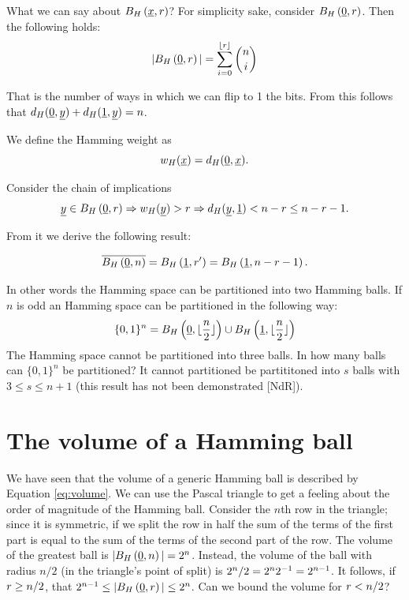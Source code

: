 What we can say about $B_H\left(\underline{x}, r\right)$? For simplicity sake, consider $B_H\left(\underline{0}, r\right)$. Then the following holds:
\begin{equation}\label{eq:volume}
	|B_H\left(\underline{0}, r\right)| = \sum_{i = 0}^{\lfloor r \rfloor} \binom{n}{i}
\end{equation}

That is the number of ways in which we can flip to 1 the bits. From this follows that $d_H(\underline{0}, \underline{y}) + d_H(\underline{1}, \underline{y}) = n$.

We define the Hamming weight as 
\begin{equation}
w_H(\underline{x}) = d_H(\underline{0}, \underline{x}).
\end{equation}

Consider the chain of implications
$$\underline{y} \in B_H\left(\underline{0}, r\right) \Rightarrow w_H(\underline{y}) > r \Rightarrow d_H(\underline{y}, \underline{1}) < n - r \leq n -r - 1.$$

From it we derive the following result:

\begin{equation}
	\overline{B_H\left(\underline{0}, n\right)} = B_H\left(\underline{1}, r'\right) = B_H\left(\underline{1}, n - r - 1\right).
\end{equation}

In other words the Hamming space can be partitioned into two Hamming balls. If $n$ is odd an Hamming space can be partitioned in the following way: $$\{0, 1\}^n = B_H\left(\underline{0}, \lfloor \dfrac{n}{2}\rfloor \right) \cup B_H\left(\underline{1}, \lfloor \dfrac{n}{2}\rfloor\right)$$
The Hamming space cannot be partitioned into three balls. In how many balls can $\{0, 1\}^n$ be partitioned? It cannot partitioned be partititoned into $s$ balls with $3 \leq s \leq n + 1$ (this result has not been demonstrated [NdR]).

\section{The volume of a Hamming ball}
We have seen that the volume of a generic Hamming ball is described by Equation \ref{eq:volume}. We can use the Pascal triangle to get a feeling about the order of magnitude of the Hamming ball. Consider the $n$th row in the triangle; since it is symmetric, if we split the row in half the sum of the terms of the first part is equal to the sum of the terms of the second part of the row. The volume of the greatest ball is $|B_H\left(\underline{0}, n\right)| = 2^n$. Instead, the volume of the ball with radius $n/2$ (in the triangle's point of split) is ${2^n}/{2} = 2^n2^{-1} = 2^{n-1}$. It follows, if $r \geq {n}/{2}$, that $2^{n-1} \leq |B_H\left(\underline{0}, r\right)| \leq 2^n$. Can we bound the volume for $r < {n}/{2}$?

